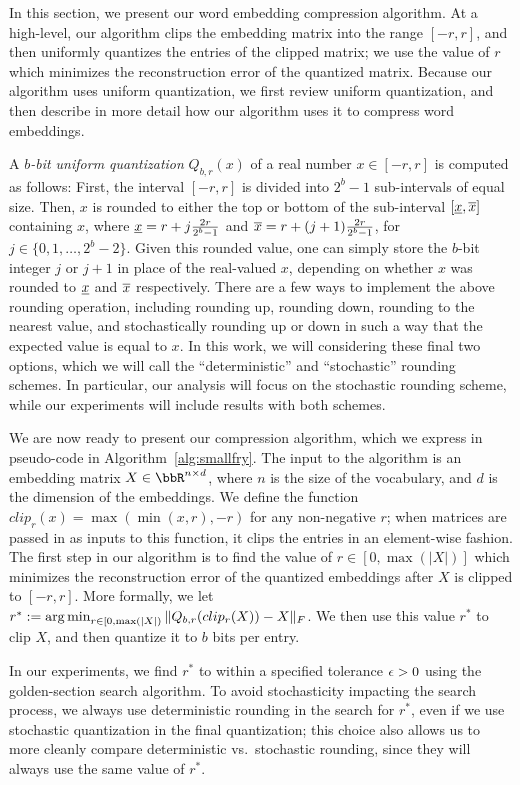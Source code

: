 In this section, we present our word embedding compression algorithm.
At a high-level, our algorithm clips the embedding matrix into the range $[-r,r]$, and then uniformly quantizes the entries of the clipped matrix;
we use the value of $r$ which minimizes the reconstruction error of the quantized matrix.
Because our algorithm uses uniform quantization, we first review uniform quantization, and then describe in more detail how our algorithm uses it to compress word embeddings.

A \textit{$b$-bit uniform quantization} $Q_{b,r}(x)$ of a real number $x \in [-r,r]$ is computed as follows:
First, the interval $[-r,r]$ is divided into $2^b - 1$ sub-intervals of equal size.
Then, $x$ is rounded to either the top or bottom of the sub-interval $[\ulx,\olx]$ containing $x$, where $\ulx = r + j\frac{2r}{2^b-1}$ and $\olx = r + (j+1)\frac{2r}{2^b-1}$, for $j\in\{0,1,\ldots,2^b-2\}$.
Given this rounded value, one can simply store the $b$-bit integer $j$ or $j+1$ in place of the real-valued $x$, depending on whether $x$ was rounded to $\ulx$ and $\olx$ respectively.
There are a few ways to implement the above rounding operation, including rounding up, rounding down, rounding to the nearest value, and stochastically rounding up or down in such a way that the expected value is equal to $x$.
In this work, we will considering these final two options, which we will call the ``deterministic'' and ``stochastic'' rounding schemes.
In particular, our analysis will focus on the stochastic rounding scheme, while our experiments will include results with both schemes.

We are now ready to present our compression algorithm, which we express in pseudo-code in Algorithm~\ref{alg:smallfry}.
The input to the algorithm is an embedding matrix $X \in \RR^{n\times d}$, where $n$ is the size of the vocabulary, and $d$ is the dimension of the embeddings.
We define the function $clip_r(x) = \max(\min(x,r),-r)$ for any non-negative $r$; when matrices are passed in as inputs to this function, it clips the entries in an element-wise fashion.
The first step in our algorithm is to find the value of $r \in [0,\max(|X|)]$ which minimizes the reconstruction error of the quantized embeddings after $X$ is clipped to $[-r,r]$.
More formally, we let $r^* \defeq \argmin_{r \in [0,\max(|X|)} \|Q_{b,r}(clip_r(X))-X\|_F$.
We then use this value $r^*$ to clip $X$, and then quantize it to $b$ bits per entry.

In our experiments, we find $r^*$ to within a specified tolerance $\eps > 0$ using the golden-section search algorithm.
To avoid stochasticity impacting the search process, we always use deterministic rounding in the search for $r^*$, even if we use stochastic quantization in the final quantization;
this choice also allows us to more cleanly compare deterministic vs.\ stochastic rounding, since they will always use the same value of $r^*$.

